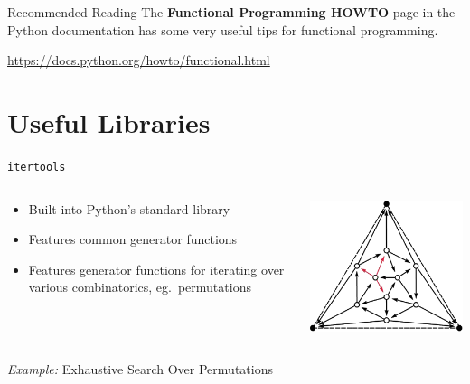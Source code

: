 \documentclass{lug}
\begin{document}
\begin{frame}{Recommended Reading}
    The \textbf{Functional Programming HOWTO} page in the Python documentation
    has some very useful tips for functional programming.

    \url{https://docs.python.org/howto/functional.html}
\end{frame}

\section{Useful Libraries}

\begin{frame}{\texttt{itertools}}
    \begin{columns}
        \begin{column}{0.7\linewidth}
            \begin{itemize}[<+->]
                \item Built into Python's standard library
                \item Features common generator functions
                \item Features generator functions for iterating over various
                    combinatorics, eg.\ permutations
            \end{itemize}
        \end{column}
        \begin{column}{0.3\linewidth}
            \includegraphics[width=\linewidth]{graphics/graph}
        \end{column}
    \end{columns}

    \pause[\thebeamerpauses]
    \bigskip

    \begin{block}{\emph{Example:} Exhaustive Search Over Permutations}
        \begin{minipage}{\linewidth}
            \tiny
            \inputminted{python3}{examples/exhaustive.py}
        \end{minipage}
    \end{block}
\end{frame}
\end{document}
